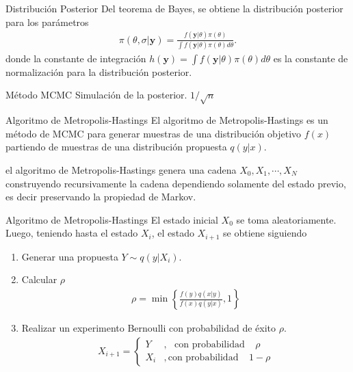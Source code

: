 \documentclass[10pt,aspectratio=169]{beamer}
\begin{document}
\begin{frame}{Distribución Posterior} 
  Del teorema de Bayes, se obtiene la distribución posterior para los parámetros
  \begin{align}
      \pi(\theta,\sigma | \mathbf{y})  = \frac{f(\mathbf{y}|\theta)\pi(\theta)}{\int f(\mathbf{y}|\theta)\pi(\theta)d \theta}.
      \label{2.2.04}
  \end{align}
  donde la constante de integración $h(\mathbf{y}) = \int f(\mathbf{y}|\theta)\pi(\theta)d \theta$ es la constante de normalización para la distribución posterior. 
\end{frame}

\begin{frame}{Método MCMC}
  Simulación de la posterior. $1/\sqrt{n}$
\end{frame}


\begin{frame}{Algoritmo de Metropolis-Hastings} 
  El algoritmo de Metropolis-Hastings es un método de MCMC para generar muestras de una distribución objetivo $f(x)$ partiendo de muestras de una distribución propuesta $q(y|x)$.

  el algoritmo de Metropolis-Hastings genera una cadena $X_0, X_1, \cdots, X_N$ construyendo recursivamente la cadena dependiendo solamente del estado previo, es decir preservando la propiedad de Markov.
\end{frame}




























\begin{frame}{Algoritmo de Metropolis-Hastings}
  El estado inicial $X_0$ se toma aleatoriamente. Luego, teniendo hasta el estado $X_i$, el estado $X_{i+1}$ se obtiene siguiendo 
  \begin{enumerate}
      \item Generar una propuesta $Y \sim q(y|X_i)$.
      \item Calcular $\rho$ 
      \begin{align*}
          \rho = \min \left \{ \frac{f(y)q(x|y)}{f(x)q(y|x)}, 1  \right \} 
      \end{align*}
      \item Realizar un experimento Bernoulli con probabilidad de éxito $\rho$.
      \begin{align*}
          X_{i+1} = \left\{\begin{matrix}
          Y & , \:\:\: \text{con probabilidad} \:\:\:\:\: \rho  \\ 
              X_{i}&,  \text{con probabilidad} \:\:\:\:\: 1- \rho  
            \end{matrix}\right.
      \end{align*}
  \end{enumerate}
\end{frame}
\end{document}
